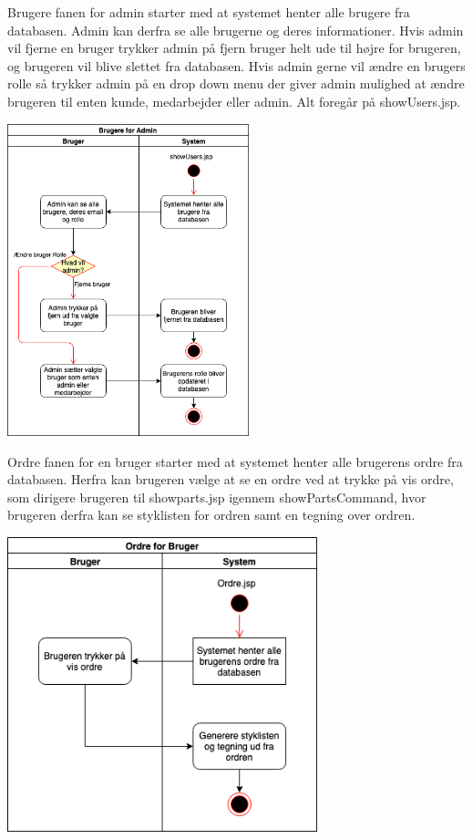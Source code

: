 \documentclass[11pt]{report}
\begin{document}
Brugere fanen for admin starter med at systemet henter alle brugere fra databasen. Admin kan derfra se alle brugerne og deres informationer. Hvis admin vil fjerne en bruger trykker admin på fjern bruger helt ude til højre for brugeren, og brugeren vil blive slettet fra databasen. Hvis admin gerne vil ændre en brugers rolle så trykker admin på en drop down menu der giver admin mulighed at ændre brugeren til enten kunde, medarbejder eller admin. Alt foregår på showUsers.jsp. \\
\begin{center}
\includegraphics[width=7cm]{BrugereAdmin.png}
\end{center}
Ordre fanen for en bruger starter med at systemet henter alle brugerens ordre fra databasen. Herfra kan brugeren vælge at se en ordre ved at trykke på vis ordre, som dirigere brugeren til showparts.jsp igennem showPartsCommand, hvor brugeren derfra kan se styklisten for ordren samt en tegning over ordren. \\
\begin{center}
\includegraphics[width=9cm]{OrdreBruger.png}
\end{center}
\end{document}

